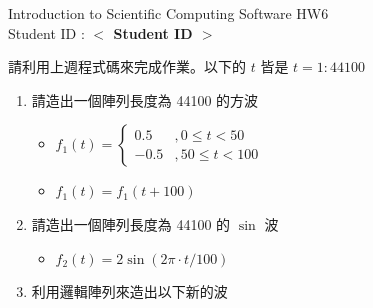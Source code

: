 \documentclass[12pt,a4paper]{article}
\newcommand{\placeholder}[1]{\textbf{$<$ #1 $>$}}
\newcommand{\idnumber}{\placeholder{Student ID}}
\begin{document}
\begin{CJK}{UTF8}{bsmi}
\begin{flushleft}Introduction to Scientific Computing Software HW6
\\Student ID : \idnumber{}\end{flushleft}

請利用上週程式碼來完成作業。以下的 $t$ 皆是 $t=1:44100$
\begin{enumerate}
\item 請造出一個陣列長度為 44100 的方波
\begin{itemize} 


\item $f_1(t)=\left\{\begin{array}{ll}0.5&,0 \le t < 50 \\ -0.5 &,50 \le t < 100\end{array}\right.$
\item $f_1(t)=f_1(t+100)$
\end{itemize}
\item 請造出一個陣列長度為 44100 的 $\sin$ 波
\begin{itemize}

\item $f_2(t)=2\sin(2\pi \cdot t/100)$
\end{itemize}

\item 利用邏輯陣列來造出以下新的波
\begin{itemize}


\end{itemize}
\end{enumerate}
\end{CJK}
\end{document}
